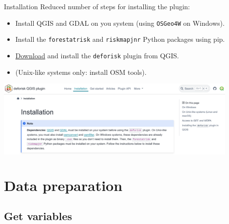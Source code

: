 \documentclass[10pt,table,dvipsnames,compress]{beamer}
\begin{document}
\begin{frame}[label={sec:org540feec},fragile]{Installation}
 Reduced number of steps for installing the plugin:

\begin{itemize}
\item Install QGIS and GDAL on you system (using \texttt{OSGeo4W} on Windows).
\item Install the \texttt{forestatrisk} and \texttt{riskmapjnr} Python packages using pip.
\item \href{https://github.com/ghislainv/deforisk-qgis-plugin/archive/refs/heads/main.zip}{Download} and install the \texttt{deforisk} plugin from QGIS.
\item (Unix-like systems only: install OSM tools).
\end{itemize}

\begin{center}
\includegraphics[width=0.9\textwidth]{figs/installation.png}
\end{center}
\end{frame}

\section{Data preparation}
\label{sec:org43b0b1c}

\subsection{Get variables}
\label{sec:org4540d1c}
\end{document}
